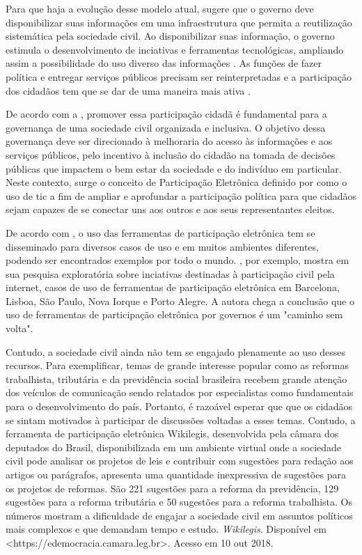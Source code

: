 \par
Para que haja a evolução desse modelo atual,  sugere que o governo deve disponibilizar suas informações em uma infraestrutura que permita a reutilização
sistemática pela sociedade civil. Ao disponibilizar suas informação, o governo estimula o desenvolvimento de inciativas e ferramentas tecnológicas, ampliando assim a possibilidade 
do uso diverso das informações \cite{zuiderwijk2012socio}. As funções de fazer política e entregar serviços públicos precisam ser reinterpretadas e a participação dos cidadãos
tem que se dar de uma maneira mais ativa \cite{bovaird2007beyond}.

\par
De acordo com a , promover essa participação cidadã é fundamental para a governança de uma sociedade civil organizada e inclusiva. O objetivo dessa governança deve
ser direcionado à melhoraria do acesso às informações e aos serviços públicos, pelo incentivo à inclusão do cidadão na tomada de decisões públicas que impactem o bem estar da 
sociedade e do indivíduo em particular.  Neste contexto, surge o conceito de Participação Eletrônica definido por  como o uso de \acrshort{tic}
a fim de ampliar e aprofundar a participação política para que cidadãos sejam capazes de se conectar uns aos outros e aos seus representantes eleitos. 

De acordo com \cite{medeiros2009novos}, o uso das ferramentas de participação eletrônica tem se disseminado para diversos casos de uso e em muitos ambientes diferentes, podendo 
ser encontrados exemplos por todo o mundo. , por exemplo, mostra em sua pesquisa exploratória sobre inciativas destinadas à participação civil
pela internet, casos de uso de ferramentas de participação eletrônica em Barcelona, Lisboa, São Paulo, Nova Iorque e Porto Alegre. A autora chega a conclusão 
que o uso de ferramentas de participação eletrônica por governos é um "caminho sem volta".

\par
Contudo, a sociedade civil ainda não tem se engajado plenamente ao uso desses recursos. Para exemplificar, temas de grande interesse popular 
como as reformas trabalhista, tributária e da previdência social brasileira recebem grande atenção dos veículos de comunicação sendo relatados por especialistas como fundamentais 
para o desenvolvimento do país. Portanto, é razoável esperar que que os cidadãos se sintam motivados à participar de discussões voltadas a esses temas. 
Contudo, a ferramenta de participação eletrônica Wikilegis, desenvolvida pela câmara dos deputados do Brasil, disponibilizada em um ambiente virtual onde a sociedade civil pode analisar
 os projetos de leis e contribuir com sugestões para redação aos artigos ou parágrafos, apresenta uma quantidade inexpressiva de sugestões para os projetos de reformas. 
 São 221 sugestões para a reforma da previdência, 129 sugestões para a reforma tributária e  50 sugestões para a reforma trabalhista.  Os números mostram a dificuldade de engajar 
 a sociedade civil em assuntos políticos mais complexos e que demandam tempo e estudo. \textit{Wikilegis}. Disponível em <https://edemocracia.camara.leg.br>. Acesso em 10 out 2018. 

